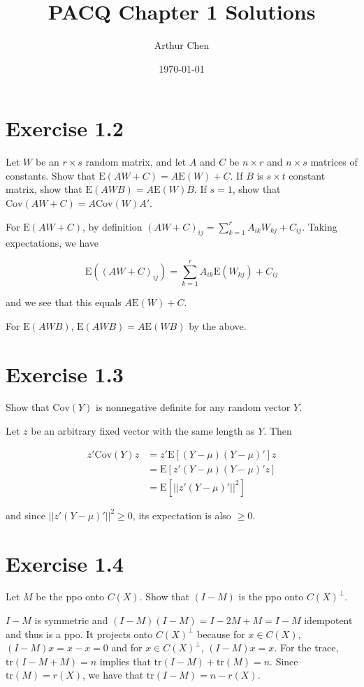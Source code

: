 \documentclass{article}
\author{Arthur Chen}
\title{PACQ Chapter 1 Solutions}
\date{\today}
\newcommand{\E}{\text{E}}
\newcommand{\cov}{\text{Cov}}
\newcommand{\tr}{\text{tr}}
\begin{document}
\maketitle

\section*{Exercise 1.2}

Let $W$ be an $r \times s$ random matrix, and let $A$ and $C$ be $n \times r$ and $n \times s$ matrices of constants. Show that $\E(AW+C) = A\E(W) + C$. If $B$ is $s \times t$ constant matrix, show that $\E(AWB) = A\E(W)B$. If $s=1$, show that $\cov(AW+C) = A\cov(W)A'$.

For $\E(AW+C)$, by definition $(AW+C)_{ij} = \sum_{k=1}^r A_{ik}W_{kj} + C_{ij}$. Taking expectations, we have

\[
\E((AW+C)_{ij}) = \sum_{k=1}^r A_{ik}\E(W_{kj}) + C_{ij}
\]

and we see that this equals $A\E(W)+C$.

For $\E(AWB)$, $\E(AWB) = A\E(WB)$ by the above.

\section*{Exercise 1.3}

Show that $\cov(Y)$ is nonnegative definite for any random vector $Y$.

Let $z$ be an arbitrary fixed vector with the same length as $Y$. Then

\begin{align*}
z'\cov(Y)z &= z'\E[(Y-\mu)(Y-\mu)']z \\
&= \E[z'(Y-\mu)(Y-\mu)'z] \\
&= \E[||z'(Y-\mu)'||^2]
\end{align*}

and since $||z'(Y-\mu)'||^2 \geq 0$, its expectation is also $\geq 0$.

\section*{Exercise 1.4}

Let $M$ be the ppo onto $C(X)$. Show that $(I-M)$ is the ppo onto $C(X)^\perp$.

$I-M$ is symmetric and $(I-M)(I-M) = I-2M+M = I-M$ idempotent and thus is a ppo. It projects onto $C(X)^\perp$ because for $x \in C(X)$, $(I-M)x = x-x=0$ and for $x \in C(X)^\perp$, $(I-M)x = x$. For the trace, $\tr(I-M+M) = n$ implies that $\tr(I-M)+\tr(M)=n$. Since $\tr(M)=r(X)$, we have that $\tr(I-M)=n-r(X)$.
\end{document}
